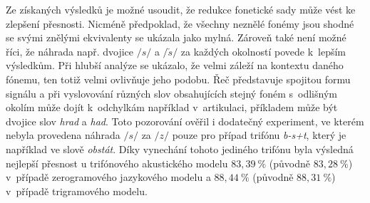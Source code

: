 

Ze získaných výsledků je možné usoudit, že redukce fonetické sady může vést ke zlepšení přesnosti.
Nicméně předpoklad, že všechny neznělé fonémy jsou shodné se svými znělými ekvivalenty se ukázala jako mylná.
Zároveň také není možné říci, že náhrada např. dvojice $/s/$ a $/\check{s}/$  za každých okolností povede  k~lepším výsledkům.
Při hlubší analýze se ukázalo, že velmi záleží na kontextu daného fónemu, ten totiž velmi ovlivňuje jeho podobu.
Řeč představuje spojitou formu signálu a při vyslovování různých slov obsahujících stejný foném s~odlišným okolím  může dojít  k~odchylkám například v~artikulaci, příkladem může být dvojice slov \textit{hrad} a \textit{had}.
Toto pozorování ověřil i dodatečný experiment, ve kterém nebyla provedena náhrada $/s/$ za $/z/$ pouze pro případ trifónu \textit{b-s+t}, který je například ve slově \textit{obstát}.
Díky vynechání tohoto jediného trifónu byla výsledná nejlepší přesnost u trifónového akustického modelu $83,39~\%$ (původně $83,28~\%$) v~případě zerogramového jazykového modelu a $88,44~\%$ (původně $88,31~\%$) v~případě trigramového modelu.


